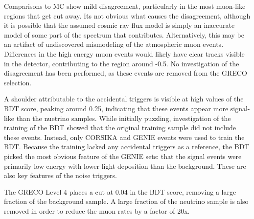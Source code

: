 Comparisons to MC show mild disagreement, particularly in the most muon-like regions that get cut away. 
Its not obvious what causes the disagreement, although it is possible that the assumed cosmic ray flux model is simply an inaccurate model of some part of the spectrum that contributes. 
Alternatively, this may be an artifact of undiscovered mismodeling of the atmospheric muon events.
Differences in the high energy muon events would likely have clear tracks visible in the detector, contributing to the region around -0.5.
No investigation of the disagreement has been performed, as these events are removed from the GRECO selection.

A shoulder attributable to the accidental triggers is visible at high values of the BDT score, peaking around 0.25, indicating that these events appear more signal-like than the nuetrino samples.
While initially puzzling, investigation of the training of the BDT showed that the original training sample did not include these events.
Instead, only CORSIKA and GENIE events were used to train the BDT.
Because the training lacked any accidental triggers as a reference, the BDT picked the most obvious feature of the GENIE sets: that the signal events were primarily low energy with lower light deposition than the background. 
These are also key features of the noise triggers. 

The GRECO Level 4 places a cut at 0.04 in the BDT score, removing a large fraction of the background sample.
A large fraction of the neutrino sample is also removed in order to reduce the muon rates by a factor of 20x.

